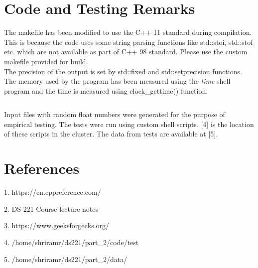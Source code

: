 \documentclass[11pt,a4paper,oneside]{article}
\begin{document}
    \section{Code and Testing Remarks}
    The makefile has been modified to use the C++ 11 standard during compilation. This is because the code uses some string parsing functions like std::stoi, std::stof etc. which are not available as part of C++ 98 standard. Please use the custom makefile provided for build.\\
    \newline
    The precision of the output is set by std::fixed and std::setprecision functions. The memory used by the program has been measured using the \emph{time} shell program and the time is measured using clock\_gettime() function. \\
    \newline
    \begin{verbatim}
    \end{verbatim}
    Input files with random float numbers were generated for the purpose of empirical testing. The tests were run using custom shell scripts. [4] is the location of these scripts in the cluster. The data from tests are available at [5].
    
    \section{References}
    
    \begin{list}{}{}
    	\item 1. https://en.cppreference.com/
    	\item 2. DS 221 Course lecture notes
    	\item 3. https://www.geeksforgeeks.org/
    	\item 4. /home/shriramr/ds221/part\_2/code/test
    	\item 5. /home/shriramr/ds221/part\_2/data/
    \end{list}
\end{document}
